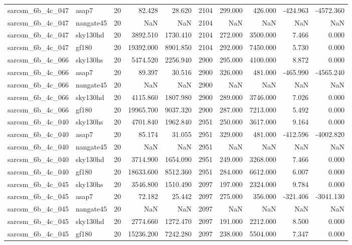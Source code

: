 \documentclass{article}
\begin{document}
\begin{longtable}{llrrrrrrrr}
sarcsm\_6b\_4c\_047 & asap7 & 20 & 82.428 & 28.620 & 2104 & 299.000 & 426.000 & -424.963 & -4572.360 \\
sarcsm\_6b\_4c\_047 & nangate45 & 20 & NaN & NaN & 2104 & NaN & NaN & NaN & NaN \\
sarcsm\_6b\_4c\_047 & sky130hd & 20 & 3892.510 & 1730.410 & 2104 & 272.000 & 3500.000 & 7.466 & 0.000 \\
sarcsm\_6b\_4c\_047 & gf180 & 20 & 19392.000 & 8901.850 & 2104 & 292.000 & 7450.000 & 5.730 & 0.000 \\
sarcsm\_6b\_4c\_066 & sky130hs & 20 & 5474.520 & 2256.940 & 2900 & 295.000 & 4100.000 & 8.872 & 0.000 \\
sarcsm\_6b\_4c\_066 & asap7 & 20 & 89.397 & 30.516 & 2900 & 326.000 & 481.000 & -465.990 & -4565.240 \\
sarcsm\_6b\_4c\_066 & nangate45 & 20 & NaN & NaN & 2900 & NaN & NaN & NaN & NaN \\
sarcsm\_6b\_4c\_066 & sky130hd & 20 & 4115.860 & 1807.980 & 2900 & 289.000 & 3746.000 & 7.026 & 0.000 \\
sarcsm\_6b\_4c\_066 & gf180 & 20 & 19965.700 & 9037.320 & 2900 & 287.000 & 7213.000 & 5.492 & 0.000 \\
sarcsm\_6b\_4c\_040 & sky130hs & 20 & 4701.840 & 1962.840 & 2951 & 250.000 & 3617.000 & 9.164 & 0.000 \\
sarcsm\_6b\_4c\_040 & asap7 & 20 & 85.174 & 31.055 & 2951 & 329.000 & 481.000 & -412.596 & -4002.820 \\
sarcsm\_6b\_4c\_040 & nangate45 & 20 & NaN & NaN & 2951 & NaN & NaN & NaN & NaN \\
sarcsm\_6b\_4c\_040 & sky130hd & 20 & 3714.900 & 1654.090 & 2951 & 249.000 & 3268.000 & 7.466 & 0.000 \\
sarcsm\_6b\_4c\_040 & gf180 & 20 & 18633.600 & 8512.360 & 2951 & 284.000 & 6612.000 & 6.007 & 0.000 \\
sarcsm\_6b\_4c\_045 & sky130hs & 20 & 3546.800 & 1510.490 & 2097 & 197.000 & 2324.000 & 9.784 & 0.000 \\
sarcsm\_6b\_4c\_045 & asap7 & 20 & 72.182 & 25.442 & 2097 & 275.000 & 356.000 & -321.406 & -3041.130 \\
sarcsm\_6b\_4c\_045 & nangate45 & 20 & NaN & NaN & 2097 & NaN & NaN & NaN & NaN \\
sarcsm\_6b\_4c\_045 & sky130hd & 20 & 2774.660 & 1272.470 & 2097 & 191.000 & 2212.000 & 8.500 & 0.000 \\
sarcsm\_6b\_4c\_045 & gf180 & 20 & 15236.200 & 7242.280 & 2097 & 238.000 & 5504.000 & 7.347 & 0.000 \\

\end{longtable}
\end{document}
